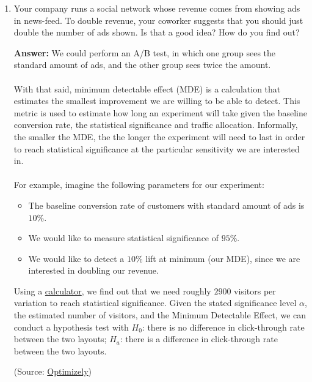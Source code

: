 \documentclass{article}
\newenvironment{QandA}{\begin{enumerate}[label=\arabic*.]}{\end{enumerate}}
\newenvironment{answer}{\par\normalfont \textbf{Answer:}}{}
\begin{document}
\begin{QandA}
    \item Your company runs a social network whose revenue comes from showing ads in news-feed. To double revenue, your coworker suggests that you should just double the number of ads shown. Is that a good idea? How do you find out?
    \begin{answer}
        We could perform an A/B test, in which one group sees the standard amount of ads, and the other group sees twice the amount. \\\\
        With that said, minimum detectable effect (MDE) is a calculation that estimates the smallest improvement we are willing to be able to detect.
        This metric is used to estimate how long an experiment will take given the baseline conversion rate, the statistical significance and traffic allocation. Informally, the smaller the MDE, the the longer the experiment will need to last in order to reach statistical significance at the particular sensitivity we are interested in.\\\\
        For example, imagine the following parameters for our experiment:
        \begin{itemize}
            \item The baseline conversion rate of customers with standard amount of ads is $10\%$.
            \item We would like to measure statistical significance of $95\%$.
            \item We would like to detect a $10\%$ lift at minimum (our MDE), since we are interested in doubling our revenue. 
        \end{itemize}
        Using a \href{https://www.optimizely.com/sample-size-calculator/?conversion=10&effect=20&significance=95}{calculator}, we find out that we need roughly $2900$ visitors per variation to reach statistical significance. Given the stated significance level $\alpha$, the estimated number of visitors, and the Minimum Detectable Effect, we can conduct a hypothesis test with $H_0$: there is no difference in click-through rate between the two layouts; $H_a$: there is a difference in click-through rate between the two layouts. 

        (Source: \href{https://support.optimizely.com/hc/en-us/articles/4410288881293-Use-minimum-detectable-effect-MDE-when-designing-an-experiment}{Optimizely})
    \end{answer}


\end{QandA}
\end{document}
